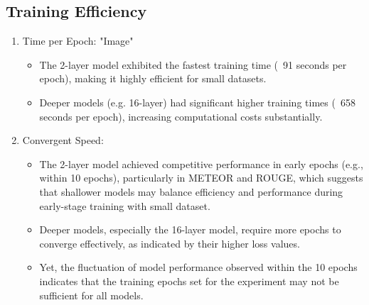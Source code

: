 \documentclass[11pt]{article}
\begin{document}
\subsection{Training Efficiency}
    \begin{enumerate}
        \item Time per Epoch:
        "Image"
        \begin{itemize}
            \item The 2-layer model exhibited the fastest training time (~91 seconds per epoch), making it highly efficient for small datasets.
            \item Deeper models (e.g. 16-layer) had significant higher training times (~658 seconds per epoch), increasing computational costs substantially.
        \end{itemize}

        \item Convergent Speed:
        \begin{itemize}
            \item The 2-layer model achieved competitive performance in early epochs (e.g., within 10 epochs), particularly in METEOR and ROUGE, which suggests that shallower models may balance efficiency and performance during early-stage training with small dataset.
            \item Deeper models, especially the 16-layer model, require more epochs to converge effectively, as indicated by their higher loss values.
            \item Yet, the fluctuation of model performance observed within the 10 epochs indicates that the training epochs set for the experiment may not be sufficient for all models.
        \end{itemize}
    \end{enumerate}
\end{document}
